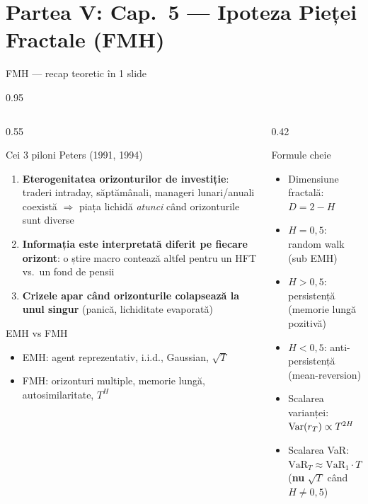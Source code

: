 \documentclass[9pt, aspectratio=169, t]{beamer}
\begin{document}
\section{Partea V: Cap.~5 --- Ipoteza Pieței Fractale (FMH)}

\begin{frame}[shrink=25]{FMH --- recap teoretic în 1 slide}
\begin{cminipage}{0.95\textwidth}
\begin{columns}[T]
\begin{column}{0.55\textwidth}
\begin{block}{Cei 3 piloni Peters (1991, 1994)}
\begin{enumerate}\setlength{\itemsep}{0pt}
    \item \textbf{Eterogenitatea orizonturilor de investiție}: traderi intraday, săptămânali, manageri lunari/anuali coexistă $\Rightarrow$ piața lichidă \emph{atunci} când orizonturile sunt diverse
    \item \textbf{Informația este interpretată diferit pe fiecare orizont}: o știre macro contează altfel pentru un HFT vs.\ un fond de pensii
    \item \textbf{Crizele apar când orizonturile colapsează la unul singur} (panică, lichiditate evaporată)
\end{enumerate}
\end{block}
\begin{exampleblock}{EMH vs FMH}
\begin{itemize}\setlength{\itemsep}{0pt}
    \item EMH: agent reprezentativ, i.i.d., Gaussian, $\sqrt T$
    \item FMH: orizonturi multiple, memorie lungă, autosimilaritate, $T^H$
\end{itemize}
\end{exampleblock}
\end{column}
\begin{column}{0.42\textwidth}
\begin{alertblock}{Formule cheie}
\begin{itemize}\setlength{\itemsep}{0pt}
    \item Dimensiune fractală: $D = 2 - H$
    \item $H = 0{,}5$: random walk (sub EMH)
    \item $H > 0{,}5$: persistență (memorie lungă pozitivă)
    \item $H < 0{,}5$: anti-persistență (mean-reversion)
    \item Scalarea varianței: $\text{Var}(r_T) \propto T^{2H}$
    \item Scalarea VaR: $\text{VaR}_T \approx \text{VaR}_1 \cdot T^H$ (\textbf{nu} $\sqrt T$ când $H \neq 0{,}5$)
\end{itemize}
\end{alertblock}
\end{column}
\end{columns}
\end{cminipage}
\end{frame}
\end{document}
